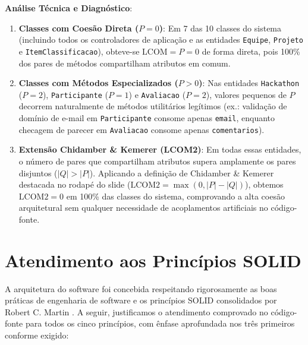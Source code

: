 \documentclass[12pt]{article}
\begin{document}
\textbf{Análise Técnica e Diagnóstico}:
\begin{enumerate}
    \item \textbf{Classes com Coesão Direta ($P = 0$)}: Em 7 das 10 classes do sistema (incluindo todos os controladores de aplicação e as entidades \texttt{Equipe}, \texttt{Projeto} e \texttt{ItemClassificacao}), obteve-se $\text{LCOM} = P = 0$ de forma direta, pois 100\% dos pares de métodos compartilham atributos em comum.
    \item \textbf{Classes com Métodos Especializados ($P > 0$)}: Nas entidades \texttt{Hackathon} ($P=2$), \texttt{Participante} ($P=1$) e \texttt{Avaliacao} ($P=2$), valores pequenos de $P$ decorrem naturalmente de métodos utilitários legítimos (ex.: validação de domínio de e-mail em \texttt{Participante} consome apenas \texttt{email}, enquanto checagem de parecer em \texttt{Avaliacao} consome apenas \texttt{comentarios}).
    \item \textbf{Extensão Chidamber \& Kemerer (LCOM2)}: Em todas essas entidades, o número de pares que compartilham atributos supera amplamente os pares disjuntos ($|Q| > |P|$). Aplicando a definição de Chidamber \& Kemerer destacada no rodapé do slide ($\text{LCOM2} = \max(0, |P| - |Q|)$), obtemos $\text{LCOM2} = 0$ em 100\% das classes do sistema, comprovando a alta coesão arquitetural sem qualquer necessidade de acoplamentos artificiais no código-fonte.
\end{enumerate}

\section{Atendimento aos Princípios SOLID}

A arquitetura do software foi concebida respeitando rigorosamente as boas práticas de engenharia de software e os princípios SOLID consolidados por Robert C. Martin \cite{martin2002}. A seguir, justificamos o atendimento comprovado no código-fonte para todos os cinco princípios, com ênfase aprofundada nos três primeiros conforme exigido:
\end{document}
